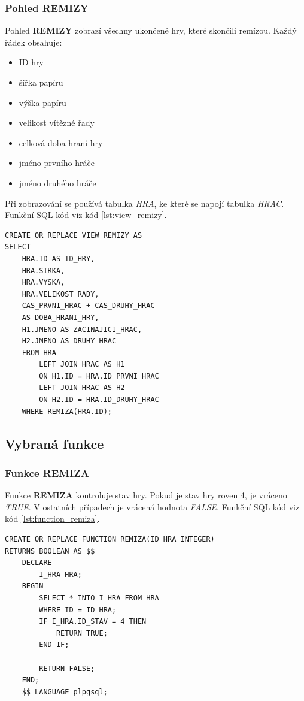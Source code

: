 \documentclass[12pt, a4paper]{article}
\begin{document}
		\subsubsection{Pohled REMIZY}
		Pohled \textbf{REMIZY} zobrazí všechny ukončené hry, které skončili remízou. Každý řádek obsahuje:
		\begin{itemize}
		\item ID hry
		\item šířka papíru
		\item výška papíru
		\item velikost vítězné řady
		\item celková doba hraní hry
		\item jméno prvního hráče
		\item jméno druhého hráče
		\end{itemize}
		Při zobrazování se používá tabulka \textit{HRA}, ke které se napojí tabulka \textit{HRAC}. Funkční SQL kód viz kód \ref{lst:view_remizy}.

		\begin{lstlisting}[caption = {SQL kód pohledu \textbf{REMIZY}.}, label = {lst:view_remizy}, captionpos=b, frame=single]
CREATE OR REPLACE VIEW REMIZY AS
SELECT 
	HRA.ID AS ID_HRY, 
	HRA.SIRKA, 
	HRA.VYSKA, 
	HRA.VELIKOST_RADY, 
	CAS_PRVNI_HRAC + CAS_DRUHY_HRAC 
	AS DOBA_HRANI_HRY,
	H1.JMENO AS ZACINAJICI_HRAC,
	H2.JMENO AS DRUHY_HRAC
	FROM HRA
		LEFT JOIN HRAC AS H1
		ON H1.ID = HRA.ID_PRVNI_HRAC
		LEFT JOIN HRAC AS H2
		ON H2.ID = HRA.ID_DRUHY_HRAC	
	WHERE REMIZA(HRA.ID);
		\end{lstlisting}

	\subsection{Vybraná funkce}
		\subsubsection{Funkce REMIZA}
		\label{function_remiza}

		Funkce \textbf{REMIZA} kontroluje stav hry. Pokud je stav hry roven 4, je vráceno \textit{TRUE}. V ostatních případech je vrácená hodnota \textit{FALSE}. Funkční SQL kód viz kód \ref{lst:function_remiza}.
		\begin{lstlisting}[caption = {SQL kód funkce \textbf{REMIZA}.}, label = {lst:function_remiza}, captionpos=b, frame=single]
CREATE OR REPLACE FUNCTION REMIZA(ID_HRA INTEGER) 
RETURNS BOOLEAN AS $$
	DECLARE
		I_HRA HRA;
	BEGIN
		SELECT * INTO I_HRA FROM HRA 
		WHERE ID = ID_HRA;
		IF I_HRA.ID_STAV = 4 THEN
			RETURN TRUE;
		END IF;
		
		RETURN FALSE;
	END;
	$$ LANGUAGE plpgsql;
		\end{lstlisting}
\end{document}
